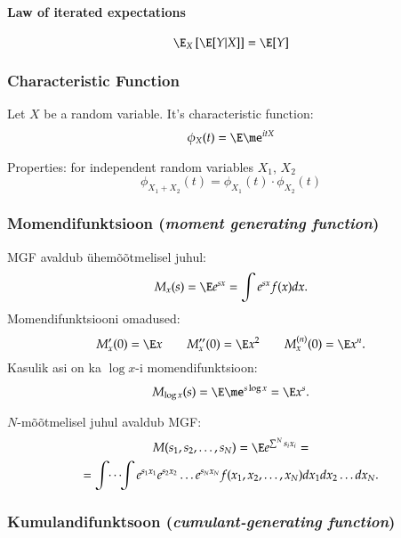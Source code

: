 \documentclass[a4paper]{article}
\numberwithin{equation}{subsection}
\begin{document}
\paragraph{Law of iterated expectations}
\begin{equation}
  \E_X
  \left[ \E [Y|X] \right]
  =
  \E [Y]
\end{equation}


\subsubsection{Characteristic  Function}
\label{sec:characteristic_function}

Let $X$ be a random variable.  It's characteristic function:
\begin{equation}
  \label{eq:characteristic_function}
  \phi_{X}(t) = \E \me^{itX}
\end{equation}

Properties: for independent random variables $X_{1}$, $X_{2}$
\begin{equation}
  \phi_{X_{1} + X_{2}}(t) = \phi_{X_{1}}(t) \cdot \phi_{X_{2}}(t)
\end{equation}

\subsubsection{Momendifunktsioon (\emph{moment generating function})}

MGF avaldub ühemõõtmelisel juhul:
\begin{equation}
M_x (s) = \E e^{sx} = \int e^{sx} f(x) dx.
\end{equation}
Momendifunktsiooni omadused:
\begin{equation}
M_x'(0) = \E x \qquad M_x''(0) = \E x^2 \qquad 
  M_x^{(n)}(0) = \E x^n.
\end{equation}
Kasulik asi on ka $\log x$-i momendifunktsioon:
\begin{equation}
M_{\log x}(s) = \E \me^{s \log x} = \E x^s.
\end{equation}

$N$-mõõtmelisel juhul avaldub MGF:
\begin{multline}
M( s_1,s_2,\ldots,s_N) = \E e^{\sum^N s_i x_i} = \\
= \idotsint e^{s_1 x_1}
  e^{s_2 x_2} \ldots e^{s_N x_N} f(x_1,x_2,\ldots, x_N) dx_1 dx_2 \ldots
  dx_N. 
\end{multline}

\subsubsection{Kumulandifunktsoon (\emph{cumulant-generating function})}
\end{document}
